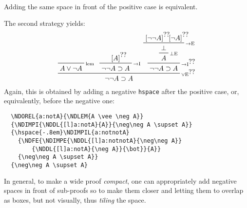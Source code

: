 \documentclass{amsart}
\begin{document}
Adding the same space in front of the positive case is equivalent.

The second strategy yields:
\begin{displaymath}
  \begin{prfenv}
    \NDOREL{a:notA}{\NDLEM{A \vee \neg A}}
    {\NDIMPI{\NDDL{[l]a:notA}{A}}{\neg\neg A \supset A}}
    {\hspace{-.4em}\NDIMPIL{a:notnotA}
      {\NDFE{\NDIMPE{\NDDL{[l]a:notnotA}{\neg\neg A}}
          {\NDDL{[l]a:notA}{\neg A}}{\bot}}{A}} 
      {\neg\neg A \supset A}}
    {\neg\neg A \supset A}
  \end{prfenv}
\end{displaymath}
Again, this is obtained by adding a negative \verb|hspace| after the
positive case, or, equivalently, before the negative one:
\begin{verbatim}
  \NDOREL{a:notA}{\NDLEM{A \vee \neg A}}
  {\NDIMPI{\NDDL{[l]a:notA}{A}}{\neg\neg A \supset A}}
  {\hspace{-.8em}\NDIMPIL{a:notnotA}
    {\NDFE{\NDIMPE{\NDDL{[l]a:notnotA}{\neg\neg A}}
        {\NDDL{[l]a:notA}{\neg A}}{\bot}}{A}} 
    {\neg\neg A \supset A}}
  {\neg\neg A \supset A}
\end{verbatim}

In general, to make a wide proof \emph{compact}, one can appropriately
add negative spaces in front of sub-proofs so to make them closer and
letting them to overlap as boxes, but not visually, thus \emph{tiling}
the space.\vspace{2ex}
\end{document}
